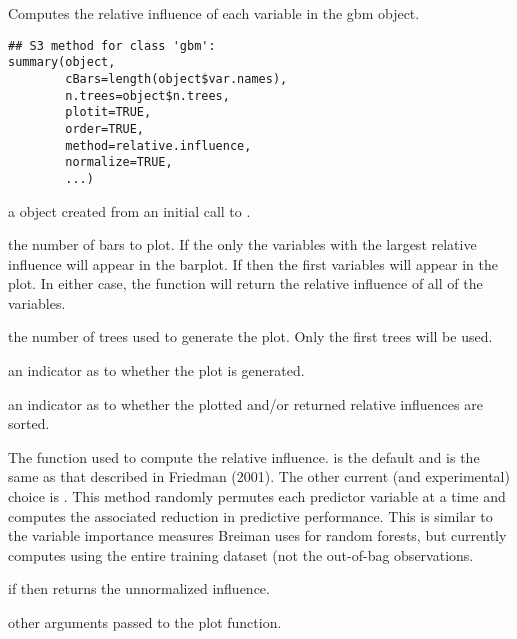 \documentclass{article}
\begin{document}
\begin{Description}\relax
Computes the relative influence of each variable in the gbm object.
\end{Description}
\begin{Usage}
\begin{verbatim}
## S3 method for class 'gbm':
summary(object,
        cBars=length(object$var.names),
        n.trees=object$n.trees,
        plotit=TRUE,
        order=TRUE,
        method=relative.influence,
        normalize=TRUE,
        ...)
\end{verbatim}
\end{Usage}
\begin{Arguments}
\begin{ldescription}
\item[\code{object}] a  object created from an initial call to
.
\item[\code{cBars}] the number of bars to plot. If  the only the
variables with the  largest relative influence will appear in the
barplot. If  then the first  variables will
appear in the plot. In either case, the function will return the relative
influence of all of the variables.
\item[\code{n.trees}] the number of trees used to generate the plot. Only the first
 trees will be used.
\item[\code{plotit}] an indicator as to whether the plot is generated. 
\item[\code{order}] an indicator as to whether the plotted and/or returned relative
influences are sorted. 
\item[\code{method}] The function used to compute the relative influence.
 is the default and is the same as that
described in Friedman (2001). The other current (and experimental) choice is
. This method randomly permutes each predictor
variable at a time and computes the associated reduction in predictive
performance. This is similar to the variable importance measures Breiman uses
for random forests, but  currently computes using the entire training
dataset (not the out-of-bag observations.
\item[\code{normalize}] if  then  returns the 
unnormalized influence. 
\item[\code{...}] other arguments passed to the plot function. 
\end{ldescription}
\end{Arguments}
\end{document}
